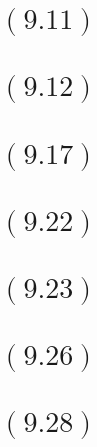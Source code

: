 \documentclass[letterpaper,12pt,titlepage]{article}
\begin{document}
\begin{mdframed}[style=MyFrame]
\end{mdframed}

\section*{$(9.11)$} 

\begin{mdframed}[style=MyFrame]
\end{mdframed}

\section*{$(9.12)$} 

\begin{mdframed}[style=MyFrame]
\end{mdframed}

\section*{$(9.17)$} 

\begin{mdframed}[style=MyFrame]
\end{mdframed}

\section*{$(9.22)$} 

\begin{mdframed}[style=MyFrame]
\end{mdframed}

\section*{$(9.23)$} 

\begin{mdframed}[style=MyFrame]
\end{mdframed}

\section*{$(9.26)$} 

\begin{mdframed}[style=MyFrame]
\end{mdframed}

\section*{$(9.28)$} 
\end{document}
